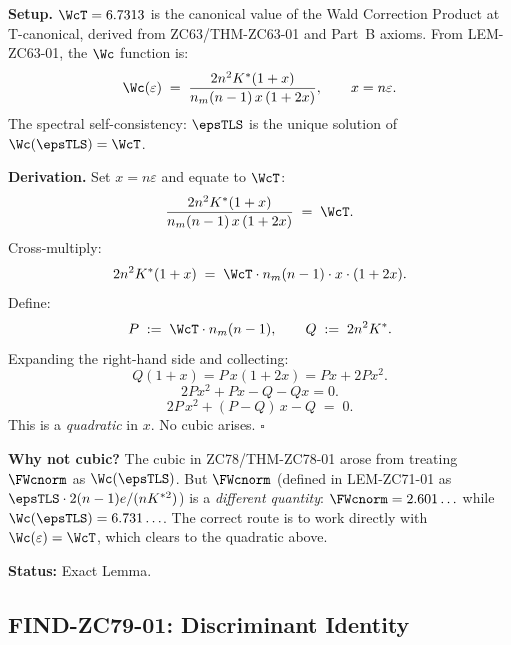 \documentclass[12pt, a4paper]{article}
\begin{document}
\begin{formalbox}[title={LEM-ZC79-01: $\Wc(\epsTLS) = \WcT$ Gives a
  Quadratic ($R_0$, Exact)}]

\textbf{Setup.}
$\WcT = 6.7313$ is the canonical value of the Wald Correction
Product at T-canonical, derived from ZC63/THM-ZC63-01
and Part~B axioms.
From LEM-ZC63-01, the $\Wc$ function is:
\begin{equation}
  \Wc(\varepsilon)
  \;=\;
  \frac{2n^2 K^*(1+x)}{n_m(n-1)\,x\,(1+2x)},
  \qquad x = n\varepsilon.
  \label{eq:Wc}
\end{equation}
The spectral self-consistency: $\epsTLS$ is the unique
solution of $\Wc(\epsTLS) = \WcT$.

\textbf{Derivation.}
Set $x = n\varepsilon$ and equate to $\WcT$:
\[
  \frac{2n^2 K^*(1+x)}{n_m(n-1)\,x\,(1+2x)} \;=\; \WcT.
\]
Cross-multiply:
\[
  2n^2 K^*(1+x)
  \;=\;
  \WcT \cdot n_m(n-1) \cdot x \cdot (1+2x).
\]
Define:
\begin{equation}
  P \;:=\; \WcT \cdot n_m(n-1), \qquad Q \;:=\; 2n^2 K^*.
  \label{eq:PQ}
\end{equation}
Expanding the right-hand side and collecting:
\[
  Q(1+x) = P\,x(1+2x) = P x + 2Px^2.
\]
\[
  2Px^2 + Px - Q - Qx = 0.
\]
\begin{equation}
  \boxed{2P\,x^2 + (P-Q)\,x - Q \;=\; 0.}
  \label{eq:quadratic}
\end{equation}
This is a \emph{quadratic} in $x$. No cubic arises.
\hfill$\square$

\textbf{Why not cubic?}
The cubic in ZC78/THM-ZC78-01 arose from treating
$\FWcnorm$ as $\Wc(\epsTLS)$.
But $\FWcnorm$ (defined in LEM-ZC71-01 as
$\epsTLS \cdot 2(n-1)e/(nK^{*2})$) is a
\emph{different quantity}: $\FWcnorm = 2.601\ldots$ while
$\Wc(\epsTLS) = 6.731\ldots$.
The correct route is to work directly with
$\Wc(\varepsilon) = \WcT$, which clears to the quadratic
above.

\textbf{Status:} Exact Lemma.
\end{formalbox}

\subsection{FIND-ZC79-01: Discriminant Identity}
\label{sec:find}

\end{document}
